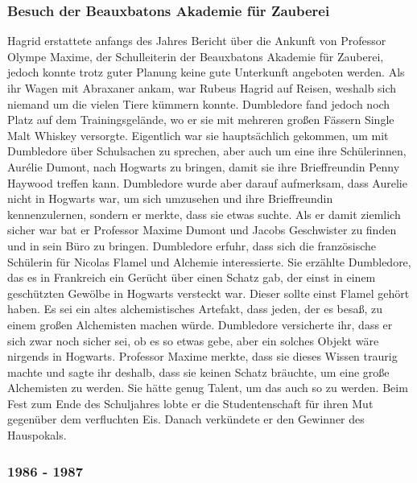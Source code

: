 \documentclass[a4paper, 10pt]{article}
\begin{document}
\subsubsection*{Besuch der Beauxbatons Akademie für Zauberei}
Hagrid erstattete anfangs des Jahres Bericht über die Ankunft von Professor Olympe Maxime, der Schulleiterin der Beauxbatons Akademie für Zauberei, jedoch konnte trotz guter Planung keine gute Unterkunft angeboten werden. Als ihr Wagen mit Abraxaner ankam, war Rubeus Hagrid auf Reisen, weshalb sich niemand um die vielen Tiere kümmern konnte. Dumbledore fand jedoch noch Platz auf dem Trainingsgelände, wo er sie mit mehreren großen Fässern Single Malt Whiskey versorgte. Eigentlich war sie hauptsächlich gekommen, um mit Dumbledore über Schulsachen zu sprechen, aber auch um eine ihre Schülerinnen, Aurélie Dumont, nach Hogwarts zu bringen, damit sie ihre Brieffreundin Penny Haywood treffen kann. Dumbledore wurde aber darauf aufmerksam, dass Aurelie nicht in Hogwarts war, um sich umzusehen und ihre Brieffreundin kennenzulernen, sondern er merkte, dass sie etwas suchte. Als er damit ziemlich sicher war bat er Professor Maxime Dumont und Jacobs Geschwister zu finden und in sein Büro zu bringen.
\vspace{10pt}
\newline
Dumbledore erfuhr, dass sich die französische Schülerin für Nicolas Flamel und Alchemie interessierte. Sie erzählte Dumbledore, das es in Frankreich ein Gerücht über einen Schatz gab, der einst in einem geschützten Gewölbe in Hogwarts versteckt war. Dieser sollte einst Flamel gehört haben. Es sei ein altes alchemistisches Artefakt, dass jeden, der es besaß, zu einem großen Alchemisten machen würde. Dumbledore versicherte ihr, dass er sich zwar noch sicher sei, ob es so etwas gebe, aber ein solches Objekt wäre nirgends in Hogwarts. Professor Maxime merkte, dass sie dieses Wissen traurig machte und sagte ihr deshalb, dass sie keinen Schatz bräuchte, um eine große Alchemisten zu werden. Sie hätte genug Talent, um das auch so zu werden.
\vspace{10pt}
\newline
Beim Fest zum Ende des Schuljahres lobte er die Studentenschaft für ihren Mut gegenüber dem verfluchten Eis. Danach verkündete er den Gewinner des Hauspokals.

\subsubsection*{1986 - 1987}
\end{document}
